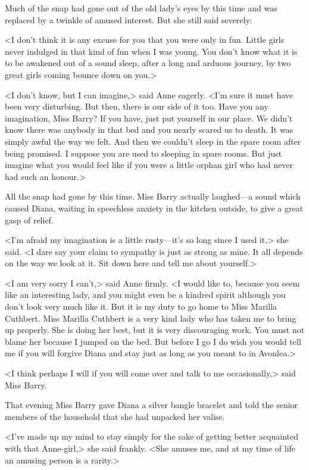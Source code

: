 Much of the snap had gone out of the old lady's eyes by this time and was replaced by a twinkle of amused interest. But she still said severely:

<I don't think it is any excuse for you that you were only in fun. Little girls never indulged in that kind of fun when I was young. You don't know what it is to be awakened out of a sound sleep, after a long and arduous journey, by two great girls coming bounce down on you.>

<I don't know, but I can imagine,> said Anne eagerly. <I'm sure it must have been very disturbing. But then, there is our side of it too. Have you any imagination, Miss Barry? If you have, just put yourself in our place. We didn't know there was anybody in that bed and you nearly scared us to death. It was simply awful the way we felt. And then we couldn't sleep in the spare room after being promised. I suppose you are used to sleeping in spare rooms. But just imagine what you would feel like if you were a little orphan girl who had never had such an honour.>

All the snap had gone by this time. Miss Barry actually laughed—a sound which caused Diana, waiting in speechless anxiety in the kitchen outside, to give a great gasp of relief.

<I'm afraid my imagination is a little rusty—it's so long since I used it,> she said. <I dare say your claim to sympathy is just as strong as mine. It all depends on the way we look at it. Sit down here and tell me about yourself.>

<I am very sorry I can't,> said Anne firmly. <I would like to, because you seem like an interesting lady, and you might even be a kindred spirit although you don't look very much like it. But it is my duty to go home to Miss Marilla Cuthbert. Miss Marilla Cuthbert is a very kind lady who has taken me to bring up properly. She is doing her best, but it is very discouraging work. You must not blame her because I jumped on the bed. But before I go I do wish you would tell me if you will forgive Diana and stay just as long as you meant to in Avonlea.>

<I think perhaps I will if you will come over and talk to me occasionally,> said Miss Barry.

That evening Miss Barry gave Diana a silver bangle bracelet and told the senior members of the household that she had unpacked her valise.

<I've made up my mind to stay simply for the sake of getting better acquainted with that Anne-girl,> she said frankly. <She amuses me, and at my time of life an amusing person is a rarity.>

